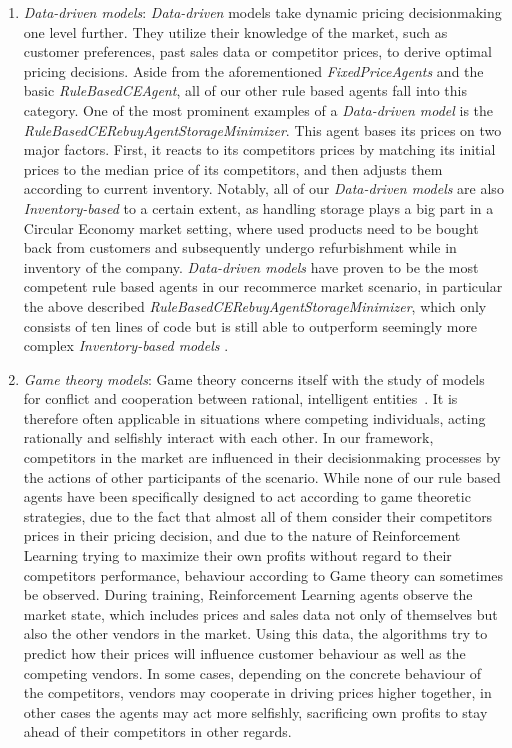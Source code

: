 \begin{enumerate}
	\item \emph{Data-driven models}: \emph{Data-driven} models take dynamic pricing decisionmaking one level further. They utilize their knowledge of the market, such as customer preferences, past sales data or competitor prices, to derive optimal pricing decisions. Aside from the aforementioned \emph{FixedPriceAgents} and the basic \emph{RuleBasedCEAgent}, all of our other rule based agents fall into this category. One of the most prominent examples of a \emph{Data-driven model} is the \emph{RuleBasedCERebuyAgentStorageMinimizer}. This agent bases its prices on two major factors. First, it reacts to its competitors prices by matching its initial prices to the median price of its competitors, and then adjusts them according to current inventory. Notably, all of our \emph{Data-driven models} are also \emph{Inventory-based} to a certain extent, as handling storage plays a big part in a Circular Economy market setting, where used products need to be bought back from customers and subsequently undergo refurbishment while in inventory of the company. \emph{Data-driven models} have proven to be the most competent rule based agents in our recommerce market scenario, in particular the above described \emph{RuleBasedCERebuyAgentStorageMinimizer}, which only consists of ten lines of code but is still able to outperform seemingly more complex \emph{Inventory-based models} .

	\item \emph{Game theory models}:\label{bullet:GameTheory} Game theory concerns itself with the study of models for conflict and cooperation between rational, intelligent entities~\cite{GameTheory}. It is therefore often applicable in situations where competing individuals, acting rationally and selfishly interact with each other. In our framework, competitors in the market are influenced in their decisionmaking processes by the actions of other participants of the scenario. While none of our rule based agents have been specifically designed to act according to game theoretic strategies, due to the fact that almost all of them consider their competitors prices in their pricing decision, and due to the nature of Reinforcement Learning trying to maximize their own profits without regard to their competitors performance, behaviour according to Game theory can sometimes be observed.  During training, Reinforcement Learning agents observe the market state, which includes prices and sales data not only of themselves but also the other vendors in the market. Using this data, the algorithms try to predict how their prices will influence customer behaviour as well as the competing vendors. In some cases, depending on the concrete behaviour of the competitors, vendors may cooperate in driving prices higher together, in other cases the agents may act more selfishly, sacrificing own profits to stay ahead of their competitors in other regards. 


\end{enumerate}
